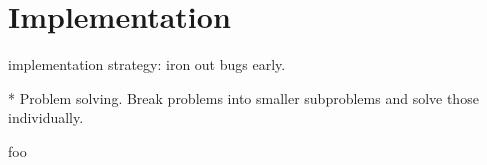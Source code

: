 
%
%
%
%
%
%





\section{Implementation}
\label{sec:implementation}


implementation strategy: iron out bugs early.

* Problem solving. Break problems into smaller subproblems and solve those individually.

foo







